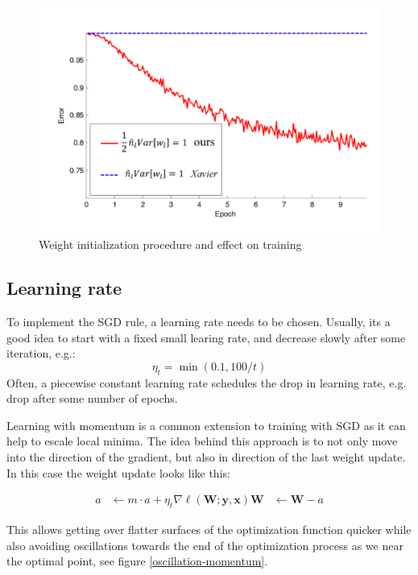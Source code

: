 \documentclass[a4paper,10pt,twoside]{article}
\newlength{\drop}
\begin{document}
\begin{figure}
    \centering
    \includegraphics[]{figures/weight-init-he-xavier.png}
    \caption{Weight initialization procedure and effect on training}
    \label{weight-init-he-xavier}
\end{figure}

\subsection{Learning rate}

To implement the SGD rule, a learning rate needs to be chosen. Usually, its a good idea to start with a fixed small learing rate, and decrease slowly after some iteration, e.g.:
\begin{equation*}
    \eta_t=\min (0.1, 100/t)
\end{equation*}
Often, a piecewise constant learning rate schedules the drop in learning rate, e.g. drop after some number of epochs.

Learning with momentum is a common extension to training with SGD as it can help to escale local minima. The idea behind this approach is to not only move into the direction of the gradient, but also in direction of the last weight update. In this case the weight update looks like this:

\begin{align*}
    a&\leftarrow m\cdot a+\eta_t\nabla\ell(\mathbf{W};\mathbf{y},\mathbf{x})
    \mathbf{W}&\leftarrow\mathbf{W}-a
\end{align*}

This allows getting over flatter surfaces of the optimization function quicker while also avoiding oscillations towards the end of the optimization process as we near the optimal point, see figure \ref{oscillation-momentum}. 
\end{document}
